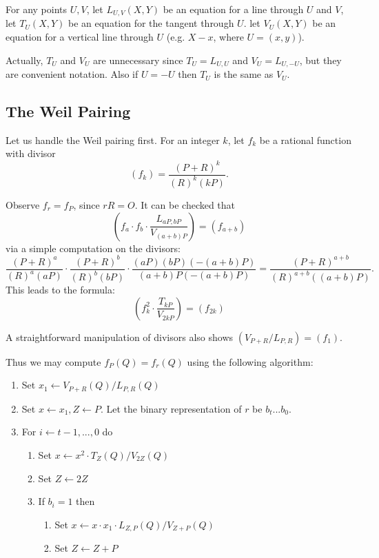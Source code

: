 For any points $U, V$,
let $L_{U,V}(X,Y)$ be an equation for a line through $U$ and $V$,
let $T_{U}(X,Y)$ be an equation for the tangent through $U$.
let
$V_{U}(X,Y)$ be an equation for a vertical line through $U$ (e.g.
$X - x$, where $U = (x, y)$).

Actually, $T_U$ and $V_U$ are unnecessary since
$T_U = L_{U,U}$ and $V_U = L_{U,-U}$, but they are convenient notation.
Also if $U = -U$ then $T_U$ is the same as $V_U$.

\subsection {The Weil Pairing}

Let us handle the Weil pairing first. For an integer $k$, let
$f_k$ be a rational function with divisor
\[
(f_k) = \frac{(P+R)^k}{(R)^k(kP)} .
\]

Observe $f_r = f_P$, since $rR = O$.
It can be checked that
\[
\left(
f_a \cdot f_b \cdot \frac{L_{aP,bP}}{V_{(a+b)P}}
\right) = (f_{a+b})
\]
via a simple computation on the divisors:
\[
\frac{(P+R)^a}{(R)^a(aP)}
\cdot
\frac{(P+R)^b}{(R)^b(bP)}
\cdot
\frac{(aP)(bP)(-(a+b)P)}{(a+b)P(-(a+b)P)}
=
\frac{(P+R)^{a+b}}{(R)^{a+b}((a+b)P)} .
\]
This leads to the formula:
\[
\left(
f_k^2 \cdot \frac{T_{kP}}{V_{2kP}}
\right) = (f_{2k})
\]

A straightforward manipulation of divisors also shows
$( V_{P+R} / L_{P,R}) = (f_1)$.

Thus we may compute $f_P(Q) = f_r(Q)$ using the following algorithm:
\begin{enumerate}
\item
Set $x_1 \leftarrow V_{P+R}(Q) / L_{P,R}(Q)$
\item
Set $x \leftarrow x_1, Z \leftarrow P$.
Let the binary representation of $r$ be $b_t ... b_0$.
\item
For $i \leftarrow t-1, ..., 0$ do
    \begin{enumerate}
    \item
    Set $x \leftarrow x^2 \cdot T_Z(Q) / V_{2Z}(Q)$
    \item
    Set $Z \leftarrow 2Z$
    \item
    If $b_i = 1$ then
	\begin{enumerate}
	\item
	Set $x \leftarrow x \cdot x_1 \cdot L_{Z, P}(Q) / V_{Z+P}(Q)$
	\item
	Set $Z \leftarrow Z + P$
	\end{enumerate}
    \end{enumerate}
\end{enumerate}

